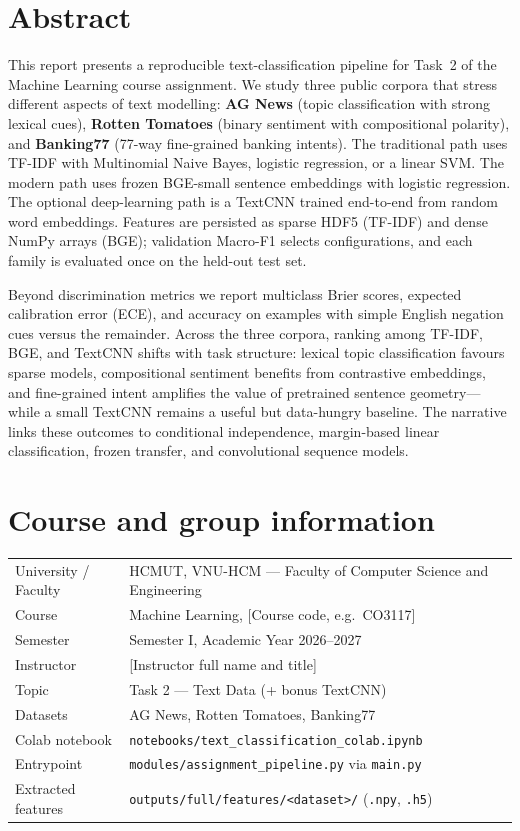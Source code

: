 \section*{Abstract}

This report presents a reproducible text-classification pipeline for Task~2 of the Machine Learning course assignment. We study three public corpora that stress different aspects of text modelling: \textbf{AG News} (topic classification with strong lexical cues), \textbf{Rotten Tomatoes} (binary sentiment with compositional polarity), and \textbf{Banking77} (77-way fine-grained banking intents). The traditional path uses TF-IDF with Multinomial Naive Bayes, logistic regression, or a linear SVM. The modern path uses frozen BGE-small sentence embeddings with logistic regression. The optional deep-learning path is a TextCNN trained end-to-end from random word embeddings. Features are persisted as sparse HDF5 (TF-IDF) and dense NumPy arrays (BGE); validation Macro-F1 selects configurations, and each family is evaluated once on the held-out test set.

Beyond discrimination metrics we report multiclass Brier scores, expected calibration error (ECE), and accuracy on examples with simple English negation cues versus the remainder. Across the three corpora, ranking among TF-IDF, BGE, and TextCNN shifts with task structure: lexical topic classification favours sparse models, compositional sentiment benefits from contrastive embeddings, and fine-grained intent amplifies the value of pretrained sentence geometry---while a small TextCNN remains a useful but data-hungry baseline. The narrative links these outcomes to conditional independence, margin-based linear classification, frozen transfer, and convolutional sequence models.

\section{Course and group information}

\begin{table}[H]
\centering
\small
\begin{tabular}{@{}ll@{}}
\toprule
University / Faculty & HCMUT, VNU-HCM --- Faculty of Computer Science and Engineering \\
Course & Machine Learning, [Course code, e.g.\ CO3117] \\
Semester & Semester I, Academic Year 2026--2027 \\
Instructor & [Instructor full name and title] \\
Topic & Task 2 --- Text Data (+ bonus TextCNN) \\
Datasets & AG News, Rotten Tomatoes, Banking77 \\
Colab notebook & \texttt{notebooks/text\_classification\_colab.ipynb} \\
Entrypoint & \texttt{modules/assignment\_pipeline.py} via \texttt{main.py} \\
Extracted features & \texttt{outputs/full/features/<dataset>/} (\texttt{.npy}, \texttt{.h5}) \\
\bottomrule
\end{tabular}
\end{table}

